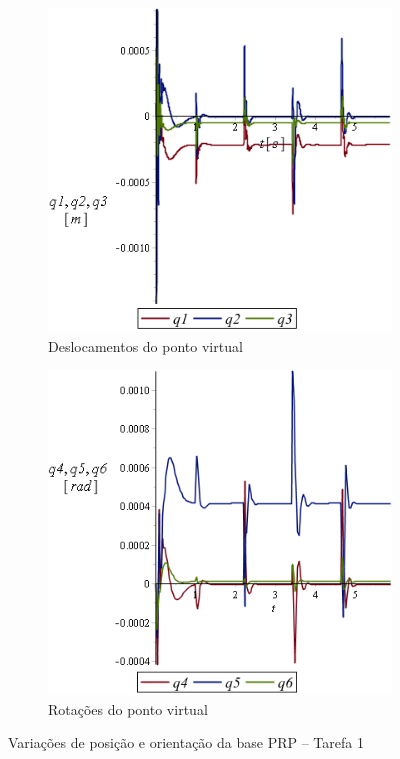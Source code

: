 \begin{figure}[h]
    \centering
    \begin{subfigure}[b]{0.48\textwidth}
        \includegraphics[width=\textwidth]{figs/t1_q123_base_prp}
        \caption{Deslocamentos do ponto virtual}
        \label{fig::t1_q123_base_prp}
    \end{subfigure}
    \quad %
    \begin{subfigure}[b]{0.48\textwidth}
        \includegraphics[width=\textwidth]{figs/t1_q456_base_prp}
        \caption{Rotações do ponto virtual}
        \label{fig::t1_q456_base_prp}
    \end{subfigure}
    \caption{Variações de posição e orientação da base PRP -- Tarefa 1}
    \label{fig::t1_q123456_base_prp}
\end{figure}

